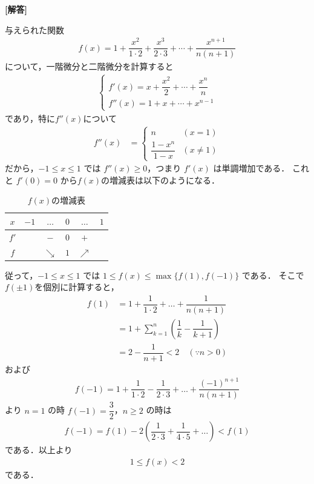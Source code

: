 \documentclass[../../main.tex]{subfiles}
\begin{document}
\begin{oframed}
  
\end{oframed}

{\bf [解答]}

与えられた関数
\begin{align}
  f(x)=1+\dfrac{x^2}{1\cdot2}+\dfrac{x^3}{2\cdot3}+\cdots+\dfrac{x^{n+1}}{n(n+1)}
\end{align}
について，一階微分と二階微分を計算すると
\begin{align}
  \begin{cases}
    f'(x) = x + \dfrac{x^2}{2} + \cdots + \dfrac{x^n}{n} \\
    f''(x) = 1 + x + \cdots + x^{n-1}
  \end{cases}
\end{align}
であり，特に$f''(x)$について
\begin{align}
  f''(x) &=
  \begin{cases}
    n & (x=1) \\
    \dfrac{1 - x^n}{1 - x} & (x\neq 1)
  \end{cases}
\end{align}
だから，$-1 \le x \le 1$ では $f''(x) \ge 0$，つまり $f'(x)$ は単調増加である．
これと $f'(0) = 0$ から$f(x)$の増減表は以下のようになる．

\begin{table}[htb]
  \centering
  \caption{$f(x)$の増減表}
  \begin{tabular}{c|ccccc}
    $x$ & $-1$ & $\dots$ & $0$ & $\dots$ & $1$ \\ \hline
    $f'$ & & $-$ & $0$ & $+$ & \\ \hline
    $f$ & & $\searrow$ & $1$ & $\nearrow$ &
  \end{tabular}
\end{table}

従って，$-1 \le x \le 1$ では $1 \le f(x) \le \max\{ f(1), f(-1) \}$ である．
そこで$f(\pm 1)$を個別に計算すると，
\begin{align}
  f(1)
  &= 1 + \dfrac{1}{1 \cdot 2} + \dots + \dfrac{1}{n(n+1)} \\
  &= 1 + \sum_{k=1}^n \left( \dfrac{1}{k} - \dfrac{1}{k+1} \right) \\
  &= 2 - \dfrac{1}{n+1} < 2 \quad (\because n > 0)
\end{align}
および
\begin{align}
  f(-1) = 1 + \dfrac{1}{1 \cdot 2} - \dfrac{1}{2 \cdot 3} + \dots + \dfrac{(-1)^{n+1}}{n(n+1)}
\end{align}
より $n=1$ の時 $f(-1) = \dfrac{3}{2}$，$n \ge 2$ の時は
\begin{align}
  f(-1) = f(1) - 2 \left( \dfrac{1}{2 \cdot 3} + \dfrac{1}{4 \cdot 5} + \dots \right) < f(1)
\end{align}
である．以上より
\begin{align}
  1 \le f(x) < 2
\end{align}
である．

\newpage
\end{document}
